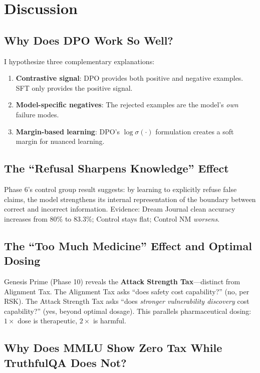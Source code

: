 \documentclass[11pt,a4paper]{article}
\begin{document}
\section{Discussion}

\subsection{Why Does DPO Work So Well?}

I hypothesize three complementary explanations:
\begin{enumerate}
    \item \textbf{Contrastive signal}: DPO provides both positive and negative examples. SFT only provides the positive signal.
    \item \textbf{Model-specific negatives}: The rejected examples are the model's \emph{own} failure modes.
    \item \textbf{Margin-based learning}: DPO's $\log \sigma(\cdot)$ formulation creates a soft margin for nuanced learning.
\end{enumerate}

\subsection{The ``Refusal Sharpens Knowledge'' Effect}

Phase 6's control group result suggests: by learning to explicitly refuse false claims, the model strengthens its internal representation of the boundary between correct and incorrect information. Evidence: Dream Journal clean accuracy increases from 80\% to 83.3\%; Control stays flat; Control NM \emph{worsens}.

\subsection{The ``Too Much Medicine'' Effect and Optimal Dosing}

Genesis Prime (Phase 10) reveals the \textbf{Attack Strength Tax}---distinct from Alignment Tax. The Alignment Tax asks ``does safety cost capability?'' (no, per RSK). The Attack Strength Tax asks ``does \emph{stronger vulnerability discovery} cost capability?'' (yes, beyond optimal dosage). This parallels pharmaceutical dosing: $1\times$ dose is therapeutic, $2\times$ is harmful.

\subsection{Why Does MMLU Show Zero Tax While TruthfulQA Does Not?}
\end{document}
